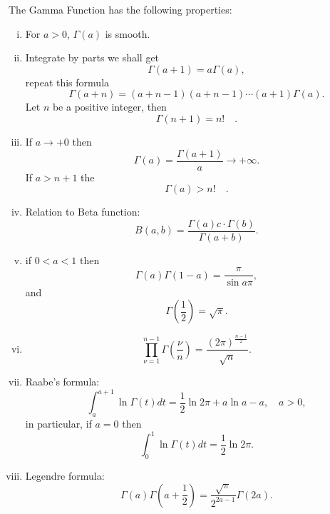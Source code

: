 \documentclass{book}
\numberwithin{equation}{section}
\begin{document}
The Gamma Function has the following properties:
\begin{enumerate}[(i)]
\item For $a>0$, $\Gamma(a)$ is smooth.
\item Integrate by parts we shall get
  \begin{equation}
    \Gamma(a+1)=a\Gamma(a),
  \end{equation}
  repeat this formula
  \begin{equation}
    \Gamma(a+n)=(a+n-1)(a+n-1)\cdots(a+1)\Gamma(a).
  \end{equation}
  Let $n$ be a positive integer, then
  \begin{equation}
    \Gamma(n+1)=n!\quad.
  \end{equation}
\item If $a\to+0$ then
  \begin{equation}
    \Gamma(a)=\frac{\Gamma(a+1)}{a}\to+\infty.
  \end{equation}
  If $a>n+1$ the
  \begin{equation}
    \Gamma(a)>n!\quad.
  \end{equation}
\item Relation to Beta function:
  \begin{equation}
    B(a,b)=\frac{\Gamma(a)c\cdot\Gamma(b)}{\Gamma(a+b)}.
  \end{equation}
\item if $0<a<1$ then
  \begin{equation}
    \Gamma(a)\Gamma(1-a)=\frac{\pi}{\sin a\pi},
  \end{equation}
  and 
  \begin{equation}
    \Gamma(\frac{1}{2})=\sqrt{\pi}.
  \end{equation}
\item 
  \begin{equation}
    \prod_{\nu=1}^{n-1}\Gamma(\frac{\nu}{n})=
    \frac{(2\pi)^{\frac{n-1}{2}}}{\sqrt{n}}.
  \end{equation}
\item Raabe's formula:
  \begin{equation}
    \int_a^{a+1}\ln\Gamma(t)dt=\frac{1}{2}\ln2\pi+a\ln a-a,\quad a>0,
  \end{equation}
  in particular, if $a=0$ then
  \begin{equation}
    \int_0^1\ln\Gamma(t)dt=\frac{1}{2}\ln2\pi.
  \end{equation}
\item Legendre formula:
  \begin{equation}
    \Gamma(a)\Gamma(a+\frac{1}{2})=\frac{\sqrt{\pi}}{2^{2a-1}}\Gamma(2a).
  \end{equation}
\end{enumerate}
\end{document}
